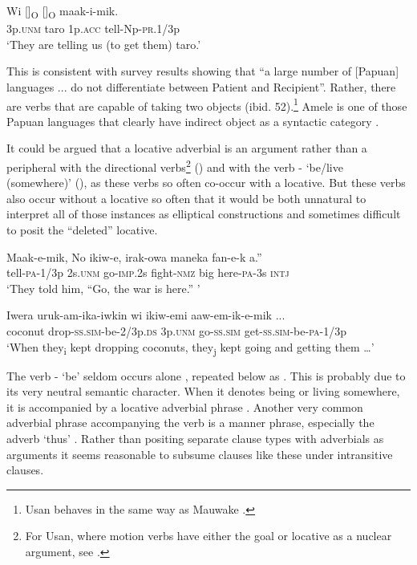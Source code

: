 \ea%
\label{ex:5:x932}
\gll Wi  []\textsubscript{O}  []\textsubscript{O}  maak-i-mik. \\
     3p.\textsc{unm}  taro  1p.\textsc{acc}  tell-Np-\textsc{pr}.1/3p \\
\glt `They are telling us (to get them) taro.'
\z

This is consistent with  survey results showing that ``a large number of [Papuan] languages ... do not differentiate between Patient and Recipient''. Rather, there are verbs that are capable of taking two objects (ibid. 52).\footnote{Usan behaves in the same way as Mauwake \citep[160]{Reesink1987}.} Amele is one of those Papuan languages that clearly have indirect object as a syntactic category \citep[69]{Roberts1987}.

It could be argued that a locative adverbial is an argument rather than a peripheral with the directional verbs\footnote{For Usan, where motion verbs have either the goal or locative as a nuclear argument, see \citet[130]{Reesink1987}.} () and with the verb - `be/live (somewhere)' (), as these verbs so often co-occur with a locative. But these verbs also occur without a locative so often that it would be both unnatural to interpret all of those instances as elliptical constructions and sometimes difficult to posit the ``deleted'' locative. 

\ea%
\label{ex:5:x1456}
\gll Maak-e-mik,  {\textquotedbl}No  ikiw-e,  irak-owa  maneka fan-e-k  a.'' \\
     tell-\textsc{pa}-1/3p  2s.\textsc{unm}  go-\textsc{imp}.2s  fight-\textsc{nmz}  big here-\textsc{pa}-3s  \textsc{intj} \\
\glt `They told him, ``Go, the war is here.'' '
\z

\ea%
\label{ex:5:x1457}
\gll Iwera  uruk-am-ika-iwkin  wi  ikiw-emi aaw-em-ik-e-mik ...\\
     coconut  drop-\textsc{ss}.\textsc{sim}-be-2/3p.\textsc{ds}  3p.\textsc{unm}  go-\textsc{ss}.\textsc{sim} get-\textsc{ss}.\textsc{sim}-be-\textsc{pa}-1/3p\\
\glt `When they\textsubscript{i} kept dropping coconuts, they\textsubscript{j} kept going and getting them {\dots}'
\z

The verb - `be' seldom occurs alone , repeated below as . This is probably due to its very neutral semantic character. When it denotes being or living somewhere, it is accompanied by a locative adverbial phrase . Another very common adverbial phrase accompanying the verb is a manner phrase, especially the adverb  `thus' . Rather than positing separate clause types with adverbials as arguments it seems reasonable to subsume clauses like these under intransitive clauses.

